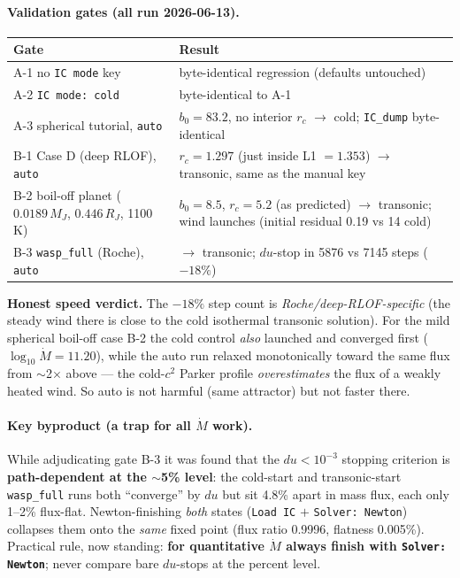 \documentclass[english,a4paper]{kiseon_memo}
\begin{document}
\paragraph{Validation gates (all run 2026-06-13).}
\begin{center}\small
\begin{tabular}{@{}p{}p{}@{}}
\toprule
Gate & Result \\
\midrule
A-1 no \texttt{IC mode} key & byte-identical regression (defaults untouched) \\
A-2 \texttt{IC mode: cold} & byte-identical to A-1 \\
A-3 spherical tutorial, \texttt{auto} & $b_0=83.2$, no interior $r_c$ $\to$ cold; \texttt{IC\_dump} byte-identical \\
B-1 Case D (deep RLOF), \texttt{auto} & $r_c = 1.297$ (just inside L1 $=1.353$) $\to$ transonic, same as the manual key \\
B-2 boil-off planet ($0.0189\,M_J$, $0.446\,R_J$, 1100\,K) & $b_0=8.5$, $r_c=5.2$ (as predicted) $\to$ transonic; wind launches (initial residual 0.19 vs 14 cold) \\
B-3 \texttt{wasp\_full} (Roche), \texttt{auto} & $\to$ transonic; $du$-stop in 5876 vs 7145 steps ($-18\%$) \\
\bottomrule
\end{tabular}
\end{center}

\noindent\textbf{Honest speed verdict.} The $-18\%$ step count is
\emph{Roche/deep-RLOF-specific} (the steady wind there is close to the cold
isothermal transonic solution). For the mild spherical boil-off case B-2 the
cold control \emph{also} launched and converged first
($\log_{10}\dot M = 11.20$), while the auto run relaxed monotonically toward
the same flux from $\sim$2$\times$ above --- the cold-$c^2$ Parker profile
\emph{overestimates} the flux of a weakly heated wind. So auto is not harmful
(same attractor) but not faster there.

\paragraph{Key byproduct (a trap for all $\dot M$ work).} While adjudicating
gate B-3 it was found that the $du<10^{-3}$ stopping criterion is
\textbf{path-dependent at the $\sim$5\% level}: the cold-start and
transonic-start \texttt{wasp\_full} runs both ``converge'' by $du$ but sit
4.8\% apart in mass flux, each only 1--2\% flux-flat. Newton-finishing
\emph{both} states (\texttt{Load IC} $+$ \texttt{Solver: Newton}) collapses
them onto the \emph{same} fixed point (flux ratio 0.9996, flatness 0.005\%).
Practical rule, now standing: \textbf{for quantitative $\dot M$ always finish
with \texttt{Solver: Newton}}; never compare bare $du$-stops at the percent
level.
\end{document}
